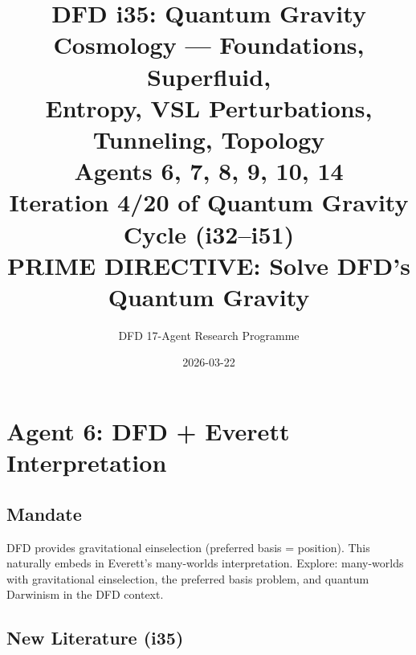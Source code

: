 \documentclass[11pt,a4paper]{article}
\title{DFD i35: Quantum Gravity Cosmology --- Foundations, Superfluid,\\Entropy, VSL Perturbations, Tunneling, Topology\\[6pt]
\large Agents 6, 7, 8, 9, 10, 14\\[6pt]
\normalsize Iteration 4/20 of Quantum Gravity Cycle (i32--i51)\\
PRIME DIRECTIVE: Solve DFD's Quantum Gravity}
\author{DFD 17-Agent Research Programme}
\date{2026-03-22}
\begin{document}
\maketitle
\tableofcontents
\newpage

\section{Agent 6: DFD + Everett Interpretation}
\label{sec:agent6}

\subsection{Mandate}

DFD provides gravitational einselection (preferred basis = position). This naturally embeds in Everett's many-worlds interpretation. Explore: many-worlds with gravitational einselection, the preferred basis problem, and quantum Darwinism in the DFD context.

\subsection{New Literature (i35)}
\end{document}
